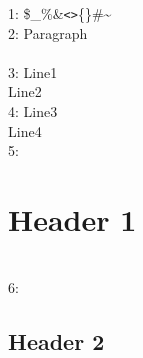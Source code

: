 \documentclass[a4paper]{article}
\begin{document}
1: \$\_\%\&\texttt{<}\texttt{>}\{\}\#\~{} \\2: Paragraph\\[0pt] \\3: Line1\\Line2 \\4: Line3\\Line4 \\5: \section{Header 1} \\6: \subsection{Header 2}
\end{document}
